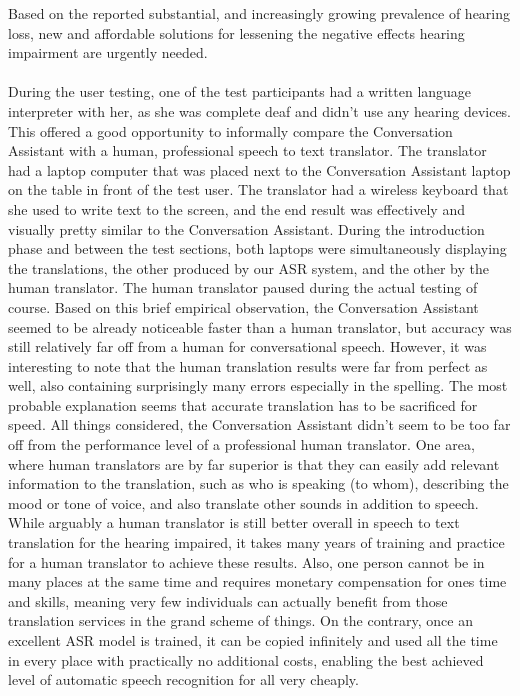 \documentclass[english, 12pt, a4paper, pdftex, elec, utf8]{aaltothesis}
\begin{document}
Based on the reported substantial, and increasingly growing prevalence of hearing loss, new and affordable solutions for lessening the negative effects hearing impairment are urgently needed. \\\\
During the user testing, one of the test participants had a written language interpreter with her, as she was complete deaf and didn't use any hearing devices. This offered a good opportunity to informally compare the Conversation Assistant with a human, professional speech to text translator. The translator had a laptop computer that was placed next to the Conversation Assistant laptop on the table in front of the test user. The translator had a wireless keyboard that she used to write text to the screen, and the end result was effectively and visually pretty similar to the Conversation Assistant. During the introduction phase and between the test sections, both laptops were simultaneously displaying the translations, the other produced by our ASR system, and the other by the human translator. The human translator paused during the actual testing of course. Based on this brief empirical observation, the Conversation Assistant seemed to be already noticeable faster than a human translator, but accuracy was still relatively far off from a human for conversational speech. However, it was interesting to note that the human translation results were far from perfect as well, also containing surprisingly many errors especially in the spelling. The most probable explanation seems that accurate translation has to be sacrificed for speed. All things considered, the Conversation Assistant didn't seem to be too far off from the performance level of a professional human translator. One area, where human translators are by far superior is that they can easily add relevant information to the translation, such as who is speaking (to whom), describing the mood or tone of voice, and also translate other sounds in addition to speech. While arguably a human translator is still better overall in speech to text translation for the hearing impaired, it takes many years of training and practice for a human translator to achieve these results. Also, one person cannot be in many places at the same time and requires monetary compensation for ones time and skills, meaning very few individuals can actually benefit from those translation services in the grand scheme of things. On the contrary, once an excellent ASR model is trained, it can be copied infinitely and used all the time in every place with practically no additional costs, enabling the best achieved level of automatic speech recognition for all very cheaply. \\\\
\end{document}
